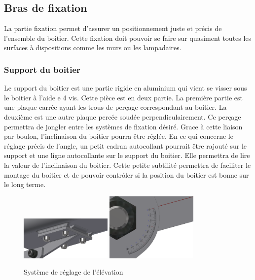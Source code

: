 \subsection{Bras de fixation}

La partie fixation permet d’assurer un positionnement juste et précis de l’ensemble du boitier. Cette 
fixation doit pouvoir se faire sur quasiment toutes les surfaces à dispositions comme les murs ou les 
lampadaires.

\subsubsection{Support du boitier}

Le support du boitier est une partie rigide en aluminium qui vient se visser sous le boitier à l’aide 
e 4 vis. Cette pièce est en deux partie. La première partie est une plaque carrée ayant les trous de 
perçage correspondant au boitier. La deuxième est une autre plaque percée soudée perpendiculairement. 
Ce perçage permettra de jongler entre les systèmes de fixation désiré. Grace à cette liaison par boulon, 
l’inclinaison du boitier pourra être réglée.
En ce qui concerne le réglage précis de l’angle, un petit cadran autocollant pourrait être rajouté 
sur le support et une ligne autocollante sur le support du boitier. Elle permettra de lire la valeur 
de l’inclinaison du boitier. Cette petite subtilité permettra de faciliter le montage du boitier et 
de pouvoir contrôler si la position du boitier est bonne sur le long terme.

\begin{figure}[H]
    \centering
    \includegraphics[width=0.4\textwidth]{Images/photos_PGA/fixdessous2.PNG}
    \includegraphics[width=0.4\textwidth]{Images/photos_PGA/mesure d'angle.PNG}
    \caption{Système de réglage de l'élévation}
    \label{fig:angle}
\end{figure}

